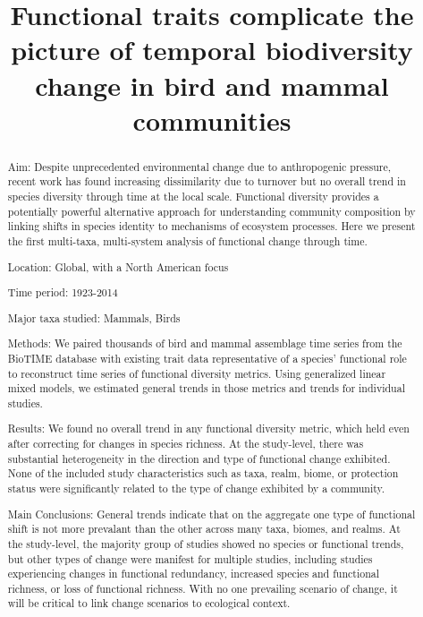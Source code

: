 \documentclass{article}
\title{Functional traits complicate the picture of temporal biodiversity
change in bird and mammal communities}
\author{
  }
\begin{document}
\maketitle


\begin{abstract}
Aim: Despite unprecedented environmental change due to anthropogenic
pressure, recent work has found increasing dissimilarity due to turnover
but no overall trend in species diversity through time at the local
scale. Functional diversity provides a potentially powerful alternative
approach for understanding community composition by linking shifts in
species identity to mechanisms of ecosystem processes. Here we present
the first multi-taxa, multi-system analysis of functional change through
time.

Location: Global, with a North American focus

Time period: 1923-2014

Major taxa studied: Mammals, Birds

Methods: We paired thousands of bird and mammal assemblage time series
from the BioTIME database with existing trait data representative of a
species' functional role to reconstruct time series of functional
diversity metrics. Using generalized linear mixed models, we estimated
general trends in those metrics and trends for individual studies.

Results: We found no overall trend in any functional diversity metric,
which held even after correcting for changes in species richness. At the
study-level, there was substantial heterogeneity in the direction and
type of functional change exhibited. None of the included study
characteristics such as taxa, realm, biome, or protection status were
significantly related to the type of change exhibited by a community.

Main Conclusions: General trends indicate that on the aggregate one type
of functional shift is not more prevalant than the other across many
taxa, biomes, and realms. At the study-level, the majority group of
studies showed no species or functional trends, but other types of
change were manifest for multiple studies, including studies
experiencing changes in functional redundancy, increased species and
functional richness, or loss of functional richness. With no one
prevailing scenario of change, it will be critical to link change
scenarios to ecological context.
\end{abstract}

\end{document}
